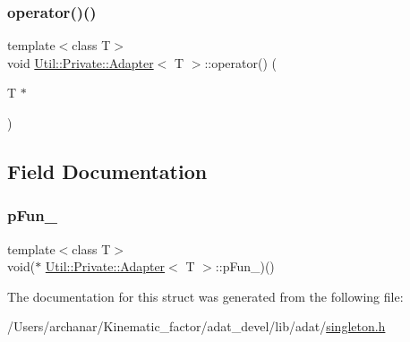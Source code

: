 \mbox{\label{structUtil_1_1Private_1_1Adapter_af610b105c762e6f42233bf8739b4fd87}} 
\subsubsection{\texorpdfstring{operator()()}{operator()()}\hspace{0.1cm}{\footnotesize\ttfamily [2/2]}}
{\footnotesize\ttfamily template$<$class T$>$ \\
void \mbox{\hyperlink{structUtil_1_1Private_1_1Adapter}{Util\+::\+Private\+::\+Adapter}}$<$ T $>$\+::operator() (\begin{DoxyParamCaption}\item[{T $\ast$}]{ }\end{DoxyParamCaption})\hspace{0.3cm}{\ttfamily [inline]}}



\subsection{Field Documentation}
\mbox{\label{structUtil_1_1Private_1_1Adapter_a06bc60369b635819913a35c3ee01e8d0}} 
\subsubsection{\texorpdfstring{pFun\_}{pFun\_}}
{\footnotesize\ttfamily template$<$class T$>$ \\
void($\ast$ \mbox{\hyperlink{structUtil_1_1Private_1_1Adapter}{Util\+::\+Private\+::\+Adapter}}$<$ T $>$\+::p\+Fun\+\_\+)()}



The documentation for this struct was generated from the following file\+:\begin{DoxyCompactItemize}
\item 
/\+Users/archanar/\+Kinematic\+\_\+factor/adat\+\_\+devel/lib/adat/\mbox{\hyperlink{lib_2adat_2singleton_8h}{singleton.\+h}}\end{DoxyCompactItemize}
